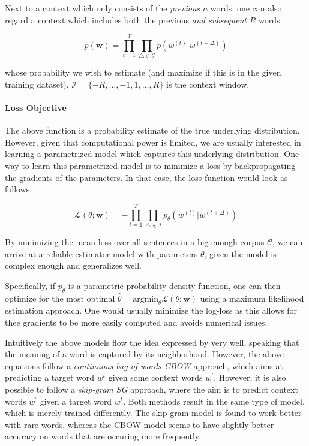 \documentclass[a4paper,12pt,twoside,openright]{report}
\begin{document}
Next to a context which only consists of the \textit{previous} $n$ words, one can also regard a context which includes both the previous \textit{and subsequent} $R$ words. 

\begin{equation}
p(\mathbf{w})=\prod_{t=1}^{T} \prod_{\triangle \in \mathcal{I} } p\left( w^{(t)} | w^{(t +\Delta)}\right)
\end{equation}{\label{eq:naive_sequential_probability}}

whose probability we wish to estimate (and maximize if this is in the given training dataset), $\mathcal{I}=\{-R, \ldots,-1,1, \ldots, R\}$ is the context window. 

\paragraph{Loss Objective} The above function is a probability estimate of the true underlying distribution.
However, given that computational power is limited, we are usually interested in learning a parametrized model which captures this underlying distribution.
One way to learn this parametrized model is to minimize a loss by backpropagating the gradients of the parameters.
In that case, the loss function would look as follows.


\begin{equation}
\mathcal{L}(\theta ; \mathbf{w})= - \prod_{t=1}^{T} \prod_{\triangle \in \mathcal{I}} p_{\theta}\left(w^{(t)} | w^{(t +\Delta)}\right)
\end{equation}{\label{eq:basic_equation_log_maximization}}

By minimizing the mean loss over all sentences in a big-enough corpus $\mathcal{C}$, we can arrive at a reliable estimator model with parameters $\theta$, given the model is complex enough and generalizes well.

Specifically, if $p_\theta$ is a parametric probability density function, one can then optimize for the most optimal $\hat{\theta} = \text{argmin}_\theta \mathcal{L}(\theta ; \mathbf{w})$ using a maximum likelihood estimation approach.
One would usually minimize the log-loss as this allows for thee gradients to be more easily computed and avoids numerical issues.

Intuitively the above models flow the idea expressed by \cite{harris54} very well, speaking that the meaning of a word is captured by its neighborhood.
However, the above equations follow a \textit{continuous bag of words CBOW} approach, which aims at predicting a target word $w^t$ given some context words $w^{\prime}$.
However, it is also possible to follow a \textit{skip-gram SG} approach, where the aim is to predict context words $w^{\prime}$ given a target word $w^t$.
Both methods result in the same type of model, which is merely trained differently.
The skip-gram model is found to work better with rare words, whereas the CBOW model seems to have slightly better accuracy on words that are occuring more frequently.
\end{document}
